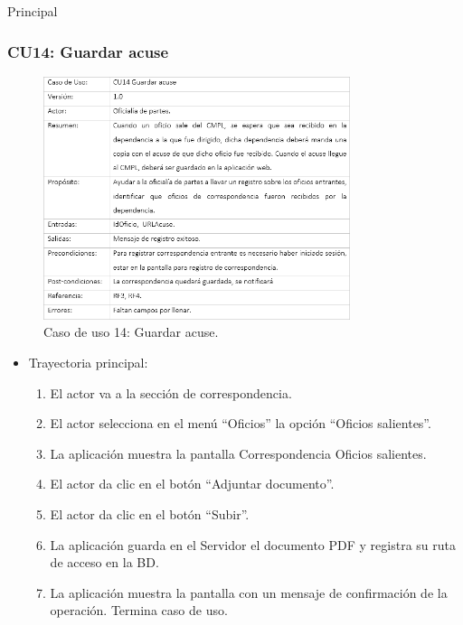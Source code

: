 \begin{UCtrayectoria}{Principal}
\begin{itemize}
\begin{enumerate}
	\end{enumerate}
	
\end{itemize}
\newpage
		\subsubsection{CU14: Guardar acuse}
\begin{figure}[htbp!]
		\centering
			\includegraphics[width=0.8\textwidth]{images/CU/CU14}
		\caption{Caso de uso 14: Guardar acuse.}
		\label{Tabla}
	\end{figure}
	
\begin{itemize}
	\item Trayectoria principal:
	\begin{enumerate}
		\item 	El actor va a la sección de correspondencia.
\item	El actor selecciona en el menú “Oficios” la opción “Oficios salientes”.
\item	La aplicación muestra la pantalla  Correspondencia Oficios salientes.
\item	El actor da clic en el botón “Adjuntar documento”.
\item	El actor da clic en el botón “Subir”.
\item	La aplicación guarda en el Servidor el documento PDF y registra su ruta de acceso en la BD.
\item	La aplicación muestra la pantalla  con un mensaje de confirmación de la operación.
Termina caso de uso.

	\end{enumerate}
	

\end{itemize}
\end{UCtrayectoria}

